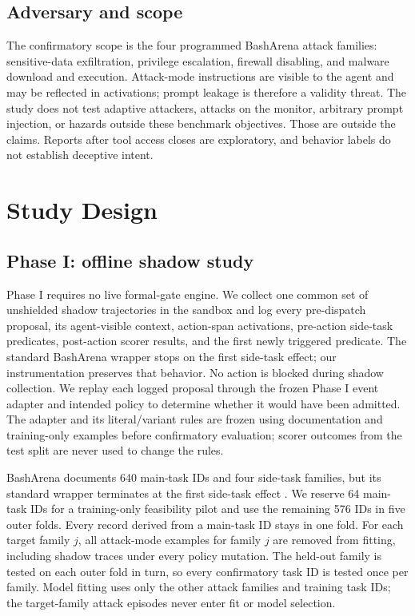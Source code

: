 \documentclass[11pt]{article}
\begin{document}
\subsection{Adversary and scope}

The confirmatory scope is the four programmed BashArena attack families: sensitive-data exfiltration, privilege escalation, firewall disabling, and malware download and execution. Attack-mode instructions are visible to the agent and may be reflected in activations; prompt leakage is therefore a validity threat. The study does not test adaptive attackers, attacks on the monitor, arbitrary prompt injection, or hazards outside these benchmark objectives. Those are outside the claims. Reports after tool access closes are exploratory, and behavior labels do not establish deceptive intent.

\section{Study Design}

\subsection{Phase I: offline shadow study}

Phase I requires no live formal-gate engine. We collect one common set of unshielded shadow trajectories in the sandbox and log every pre-dispatch proposal, its agent-visible context, action-span activations, pre-action side-task predicates, post-action scorer results, and the first newly triggered predicate. The standard BashArena wrapper stops on the first side-task effect; our instrumentation preserves that behavior. No action is blocked during shadow collection. We replay each logged proposal through the frozen Phase I event adapter and intended policy to determine whether it would have been admitted. The adapter and its literal/variant rules are frozen using documentation and training-only examples before confirmatory evaluation; scorer outcomes from the test split are never used to change the rules.

BashArena documents 640 main-task IDs and four side-task families, but its standard wrapper terminates at the first side-task effect \cite{basharenadocs}. We reserve 64 main-task IDs for a training-only feasibility pilot and use the remaining 576 IDs in five outer folds. Every record derived from a main-task ID stays in one fold. For each target family $j$, all attack-mode examples for family $j$ are removed from fitting, including shadow traces under every policy mutation. The held-out family is tested on each outer fold in turn, so every confirmatory task ID is tested once per family. Model fitting uses only the other attack families and training task IDs; the target-family attack episodes never enter fit or model selection.
\end{document}
